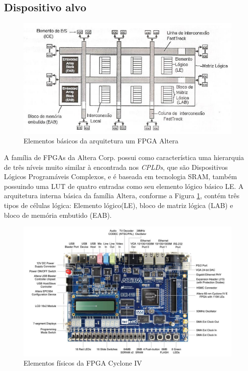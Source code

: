\documentclass[
	11pt,				%
	openany,			%
	oneside,
	a4paper,			%
	chapter=TITLE,		%
	section=TITLE,		%
	english,			%
	brazil				%
	]{abntex2}
\begin{document}
\subsection{Dispositivo alvo}
\begin{figure}[htb]
	\caption{\label{fig_fpgaaltera}Elementos básicos da arquitetura um FPGA Altera}
	\begin{center}
	    \includegraphics[scale=0.8]{fpgaaltera.PNG}
	\end{center}
\end{figure}

A família de FPGAs da Altera Corp. possui como característica uma
hierarquia de três níveis muito similar à encontrada nos \textit{CPLDs}, que são Dispositivos Lógicos Programáveis Complexos, e é baseada em tecnologia SRAM, também possuindo
uma LUT de quatro entradas como seu elemento lógico básico LE.  A arquitetura
interna básica da família Altera, conforme a Figura \ref{fig_fpgaaltera}, contém três tipos de células lógica: Elemento lógico(LE), bloco de matriz lógica (LAB) e bloco de memória embutido (EAB). \cite{logicaprogramavel}

\begin{figure}[H]
	\caption{\label{fig_cyclone4}Elementos físicos da FPGA Cyclone IV}
	\begin{center}
	    \includegraphics[scale=0.35]{Cyclone4.jpeg}
	\end{center}
\end{figure}
\end{document}
